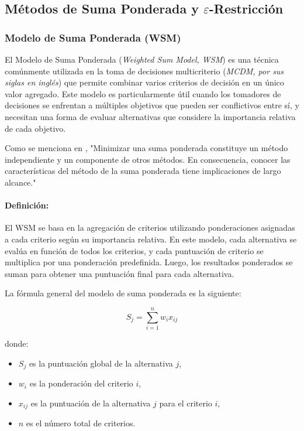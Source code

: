 \documentclass[12pt]{article}
\begin{document}
\subsection{Métodos de Suma Ponderada y $\varepsilon$-Restricción}

\subsubsection{Modelo de Suma Ponderada (WSM)}

El Modelo de Suma Ponderada (\textit{Weighted Sum Model, WSM}) es una técnica comúnmente utilizada en la toma de decisiones multicriterio (\textit{MCDM, por sus siglas en inglés}) que permite combinar varios criterios de decisión en un único valor agregado. Este modelo es particularmente útil cuando los tomadores de decisiones se enfrentan a múltiples objetivos que pueden ser conflictivos entre sí, y necesitan una forma de evaluar alternativas que considere la importancia relativa de cada objetivo.

Como se menciona en \cite{Marler2010}, "Minimizar una suma ponderada constituye un método independiente y un componente de otros métodos. En consecuencia, conocer las características del método de la suma ponderada tiene implicaciones de largo alcance."

\paragraph{Definición:}
El WSM se basa en la agregación de criterios utilizando ponderaciones asignadas a cada criterio según su importancia relativa. En este modelo, cada alternativa se evalúa en función de todos los criterios, y cada puntuación de criterio se multiplica por una ponderación predefinida. Luego, los resultados ponderados se suman para obtener una puntuación final para cada alternativa.

La fórmula general del modelo de suma ponderada es la siguiente:

\[
S_j = \sum_{i=1}^n w_i x_{ij}
\]

donde:
\begin{itemize}
	\item $S_j$ es la puntuación global de la alternativa $j$,
	\item $w_i$ es la ponderación del criterio $i$,
	\item $x_{ij}$ es la puntuación de la alternativa $j$ para el criterio $i$,
	\item $n$ es el número total de criterios.
\end{itemize}
\end{document}
